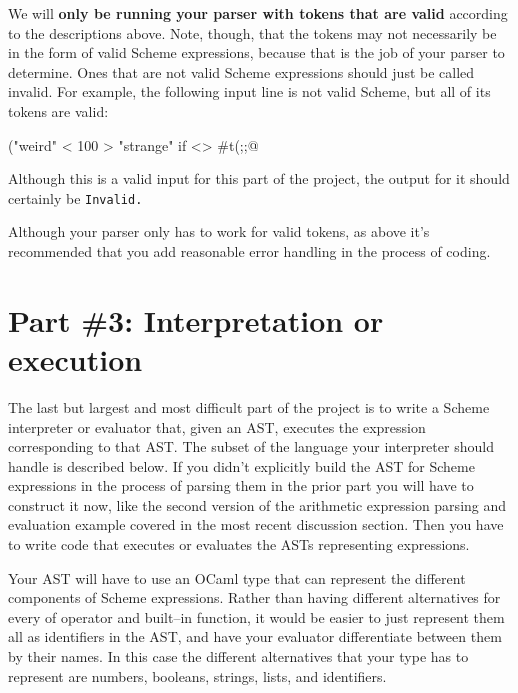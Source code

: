 \documentclass[11pt]{article}
\begin{document}
    We will \textbf{only be running your parser with tokens that are valid}
  according to the descriptions above.  Note, though, that the tokens may
  not necessarily be in the form of valid Scheme expressions, because that
  is the job of your parser to determine.  Ones that are not valid Scheme
  expressions should just be called invalid.  For example, the following
  input line is not valid Scheme, but all of its tokens are valid:

    \vspace{-1.5mm}

    \begin{center}

      \verb@("weird" < 100 > "strange" if <> #t(;;@

    \end{center}

    \vspace{-1.5mm}

    Although this is a valid input for this part of the project, the output
  for it should certainly be \texttt{Invalid.}

    Although your parser only has to work for valid tokens, as above it's
  recommended that you add reasonable error handling in the process of
  coding.

  \section{Part \#3: Interpretation or execution\label{section:eval}}

    The last but largest and most difficult part of the project is to write a
  Scheme interpreter or evaluator that, given an AST, executes the
  expression corresponding to that AST.  The subset of the language your
  interpreter should handle is described below.  If you didn't explicitly
  build the AST for Scheme expressions in the process of parsing them in the
  prior part you will have to construct it now, like the second version of
  the arithmetic expression parsing and evaluation example covered in the
  most recent discussion section.  Then you have to write code that executes
  or evaluates the ASTs representing expressions.

    Your AST will have to use an OCaml type that can represent the different
  components of Scheme expressions.  Rather than having different
  alternatives for every of operator and built--in function, it would be
  easier to just represent them all as identifiers in the AST, and have your
  evaluator differentiate between them by their names.  In this case the
  different alternatives that your type has to represent are numbers,
  booleans, strings, lists, and identifiers.
\end{document}
